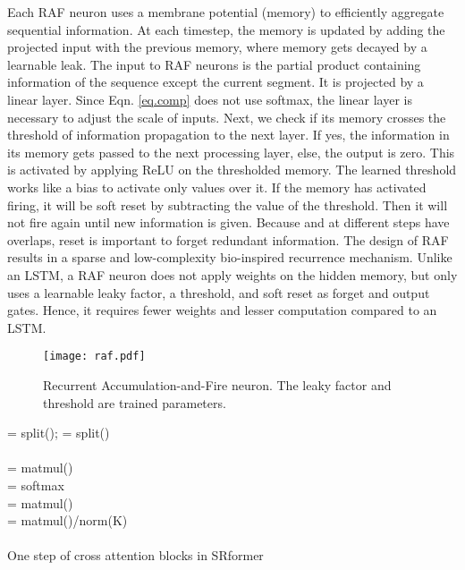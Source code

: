 \documentclass[11pt]{article}
\begin{document}
 Each RAF neuron uses a membrane potential (memory) to efficiently aggregate sequential information.  At each timestep, the memory is updated by adding the projected input with the previous memory, where memory gets decayed by a learnable leak. The input to RAF neurons is the partial product  containing information of the sequence except the current segment. It is projected by a linear layer. Since Eqn. \ref{eq.comp} does not use softmax, the linear layer is necessary to adjust the scale of inputs. Next, we check if its memory crosses the threshold of information propagation to the next layer. If yes, the information in its memory gets passed to the next processing layer, else, the output is zero. This is activated by applying ReLU on the thresholded memory. The learned threshold works like a bias to activate only values over it. If the memory has activated firing, it will be soft reset by subtracting the value of the threshold. Then it will not fire again until new information is given. Because  and  at different steps have overlaps, reset is important to forget redundant information. The design of RAF results in a sparse and low-complexity bio-inspired recurrence mechanism. Unlike an LSTM, a RAF neuron does not apply weights on the hidden memory, but only uses a learnable leaky factor, a threshold, and soft reset as forget and output gates. Hence, it requires fewer weights and lesser computation compared to an LSTM. 



\begin{figure}
    \centering
    \texttt{[image: raf.pdf]}
    \caption{Recurrent Accumulation-and-Fire neuron. The leaky factor and threshold are trained parameters.}
    \label{fig:raf}
\end{figure}



\begin{algorithm}[h]
\SetAlgoLined
{}
     = split();     = split()\\
     \\
    = matmul()\\
     = softmax\\
     = matmul()\\
     = matmul()/norm(K)\\
    \\
    
 \caption{One step of cross attention blocks in SRformer \label{algorithm1}}
\end{algorithm}
\end{document}
